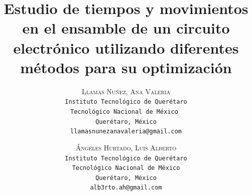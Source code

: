    \lfoot{ \thepage}
    
    \setlength{\droptitle}{-5\baselineskip} %
    \title{\textbf{ Estudio de tiempos y movimientos en el ensamble de un circuito electrónico utilizando diferentes métodos para su optimización} } %
    
     \author{ 
     \textsc{Llamas Nuñez, Ana Valeria}\\ 
     \texttt{ Instituto Tecnológico de Querétaro } \\ 
     \texttt{Tecnológico Nacional de México  } \\ 
     \texttt{Querétaro, México}\\ 
     \texttt{ llamasnunezanavaleria@gmail.com } 
     \and 
     \textsc{Ángeles Hurtado, Luis Alberto}\\ 
     \texttt{ Instituto Tecnológico de Querétaro } \\ 
     \texttt{ Tecnológico Nacional de México } \\ 
     \texttt{ Querétaro, México }\\ 
     \texttt{ alb3rto.ah@gmail.com } 
    }
    
    
    
    
